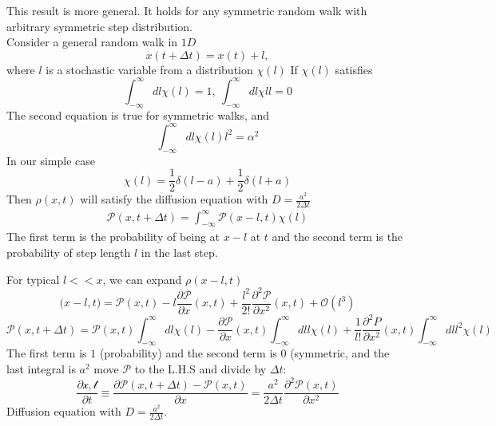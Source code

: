 \documentclass[11pt]{book}
\theoremstyle{definition}
\begin{document}
This result is more general. It holds for any symmetric random walk with arbitrary symmetric step distribution. \\
Consider a general random walk in $ 1D $ 
\[ x(t + \Delta t) = x(t) + l, \] 
where $ l $ is a stochastic variable from a distribution $ \chi(l) $ 
If $ \chi(l) $ satisfies 
\[ \int_{-\infty}^{\infty} dl \chi(l) = 1, \: \int_{-\infty}^{\infty} dl \chi{l} l = 0\] The second equation is true for symmetric walks, and
\[ \int_{-\infty}^{\infty} dl \chi(l) l^2 = \alpha^2 \] 
In our simple case
\[ \chi(l) = \frac{1}{2} \delta(l-a) + \frac{1}{2} \delta(l+a) \] 
Then $ \rho(x,t) $ will satisfy the diffusion equation with $ D = \frac{a^2}{2 \Delta t} $ 
\[ 
\begin{aligned}
	\mathcal{P}(x, t+ \Delta t) = \int_{-\infty}^{\infty} \mathcal{P} (x-l, t) \chi(l)
\end{aligned}
\] 
The first term is the probability of being at $ x-l $ at $ t $ and the second term is the probability of step length $ l $ in the last step.

For typical $ l << x $, we can expand $ \rho(x-l,t) $ 
\[ \mathcal(x-l, t) = \mathcal{P}(x,t) - l \frac{\partial \mathcal{P}}{\partial x} (x,t) + \frac{l^2}{2!} \frac{\partial ^2\mathcal{P}}{\partial x^2} (x,t) + \mathcal{O}(l^3)\] 
\[ \mathcal{P}(x,t+\Delta t) = \mathcal{P}(x,t) \int_{-\infty}^{\infty} dl \chi(l) - \frac{\partial \mathcal{P}}{\partial x} (x,t) \int_{-\infty}^{\infty} dl l \chi(l) + 
\frac{1}{l!} \frac{\partial ^2P}{\partial x^2}(x,t) \int_{-\infty}^{\infty} dl l^2 \chi(l)  \] 
The first term is $1$ (probability) and the second term is $ 0 $ (symmetric, and the last integral is $a^2$ 
move $ \mathcal{P} $ to the L.H.S and divide by $ \Delta t $:
\[ \frac{\partial \mathcal{x,t}}{\partial t} \equiv \frac{\partial \mathcal{P}(x,t + \Delta t) - \mathcal{P}(x,t)}{\partial x} = \frac{a^2}{2 \Delta t} \frac{\partial ^2 \mathcal{P}(x,t)}{\partial x^2} \] 
Diffusion equation with $ D = \frac{a^2}{2 \Delta t}$.
\end{document}
